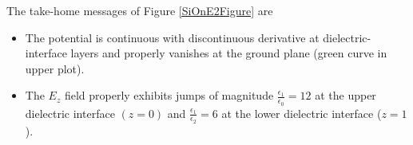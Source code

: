 \documentclass[letterpaper]{article}
\renewcommand{\wt}{\widetilde}
\begin{document}
The take-home messages of Figure \ref{SiOnE2Figure} are 
\begin{itemize}
 \item The potential is continuous with discontinuous derivative
       at dielectric-interface layers and properly vanishes at 
       the ground plane (green curve in upper plot).
 \item The $E_z$ field properly exhibits jumps of magnitude
       $\frac{\epsilon_1}{\epsilon_0}=12$ at the upper dielectric 
       interface $(z=0)$ and 
       $\frac{\epsilon_1}{\epsilon_2}=6$ at the lower dielectric interface
       ($z=1$).
\end{itemize}

%
%
\end{document}
